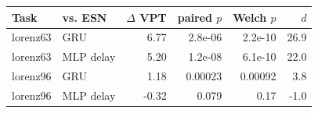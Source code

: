 \begin{tabular}{llrrrr}\toprule
Task & vs. ESN & $\Delta$ VPT & paired $p$ & Welch $p$ & $d$\\
\midrule
lorenz63 & GRU & 6.77 & 2.8e-06 & 2.2e-10 & 26.9\\
lorenz63 & MLP delay & 5.20 & 1.2e-08 & 6.1e-10 & 22.0\\
lorenz96 & GRU & 1.18 & 0.00023 & 0.00092 & 3.8\\
lorenz96 & MLP delay & -0.32 & 0.079 & 0.17 & -1.0\\
\bottomrule\end{tabular}